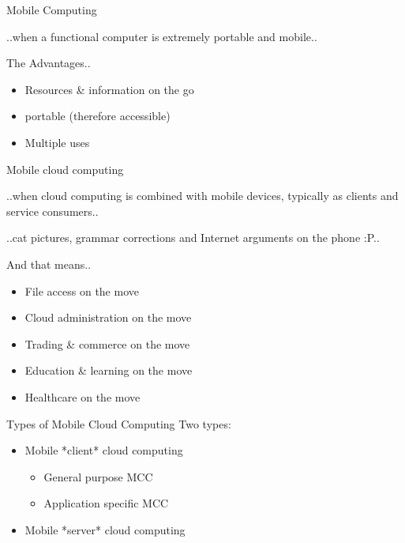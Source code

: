 \documentclass{beamer}
\begin{document}
\begin{frame}{Mobile Computing}

\begin{definition}
 ..when a functional computer is extremely portable and mobile..
\end{definition}

The Advantages..
\begin{itemize}
 \item Resources \& information on the go
 \pause
 \item portable (therefore accessible)
 \pause
 \item Multiple uses
\end{itemize}
\end{frame}

\begin{frame}{Mobile cloud computing}

\begin{definition}
 ..when cloud computing is combined with mobile devices, typically as clients and service consumers..
\end{definition}
\pause

\begin{definition}
 ..cat pictures, grammar corrections and Internet arguments on the phone :P..
\end{definition}
\pause
And that means..
 \begin{itemize}
  \item File access on the move
  \item Cloud administration on the move
  \item Trading \& commerce on the move
  \item Education \& learning on the move
  \item Healthcare on the move
 \end{itemize}
\end{frame}

\begin{frame}{Types of Mobile Cloud Computing}
Two  types:
\begin{itemize}
 \item Mobile *client* cloud computing
 \begin{itemize}
   \item General purpose MCC
   \item Application specific MCC
 \end{itemize}
 \item Mobile *server* cloud computing
\end{itemize}
\end{frame}
\end{document}
